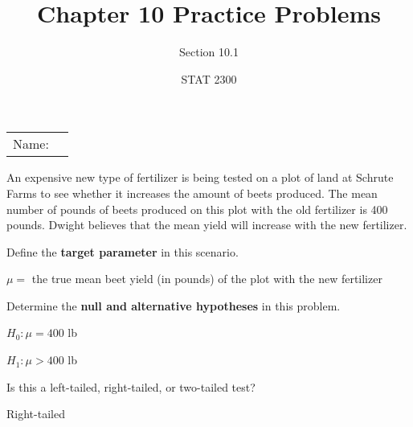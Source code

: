 \documentclass[noanswers]{exam}
\title{Chapter 10 Practice Problems}
\author{Section 10.1}
\date{STAT 2300}
\begin{document}
\noindent\begin{tabular}{@{}p{.3in}p{3in}@{}}
Name: & \hrulefill
\end{tabular}

\vspace{4mm}

\noindent An expensive new type of fertilizer is being tested on a plot of land at Schrute Farms to see whether it increases the amount of beets produced. The mean number of pounds of beets produced on this plot with the old fertilizer is 400 pounds. Dwight believes that the mean yield will increase with the new fertilizer.

\begin{questions} 

\vspace{1mm}

\question Define the \textbf{target parameter} in this scenario.

\begin{solution}[\stretch{1}]

\vspace{1mm}

$\mu=$ the true mean beet yield (in pounds) of the plot with the new fertilizer

\vspace{1mm}

\end{solution}

\question Determine the \textbf{null and alternative hypotheses} in this problem.

\begin{solution}[\stretch{1}]

\vspace{1mm}

$H_0:\mu=400$ lb

$H_1:\mu>400$ lb

\vspace{1mm}

\end{solution}

\question Is this a left-tailed, right-tailed, or two-tailed test?

\begin{solution}[\stretch{1}]

\vspace{1mm}

Right-tailed

\vspace{1mm}

\end{solution}


\end{questions}
\end{document}
